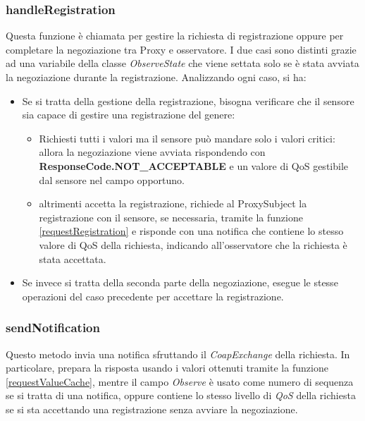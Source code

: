 			\subsubsection{handleRegistration}
				Questa funzione è chiamata per gestire la richiesta di registrazione oppure per completare la negoziazione tra Proxy e osservatore. I due casi sono distinti grazie ad una variabile della classe \textit{ObserveState} che viene settata solo se è stata avviata la negoziazione durante la registrazione. Analizzando ogni caso, si ha:
			  \begin{itemize}
			  	\item Se si tratta della gestione della registrazione, bisogna verificare che il sensore sia capace di gestire una registrazione del genere:
					 \begin{itemize}
						 \item Richiesti tutti i valori ma il sensore può mandare solo i valori critici: allora la negoziazione viene avviata rispondendo con \textbf{ResponseCode.NOT\_ACCEPTABLE} e un valore di QoS gestibile dal sensore nel campo opportuno.
						 \item altrimenti accetta la registrazione, richiede al ProxySubject la registrazione con il sensore, se necessaria, tramite la funzione \ref{requestRegistration} e risponde con una notifica che contiene lo stesso valore di QoS della richiesta, indicando all'osservatore che la richiesta è stata accettata.
					 \end{itemize}
					 
					\item Se invece si tratta della seconda parte della negoziazione, esegue le stesse operazioni del caso precedente per accettare la registrazione.
					
			  \end{itemize}


			\subsubsection{sendNotification}
				Questo metodo invia una notifica sfruttando il \textit{CoapExchange} della richiesta. In particolare, prepara la risposta usando i valori ottenuti tramite la funzione \ref{requestValueCache}, mentre il campo \textit{Observe} è usato come numero di sequenza se si tratta di una notifica, oppure contiene lo stesso livello di \textit{QoS} della richiesta se si sta accettando una registrazione senza avviare la negoziazione.
				

